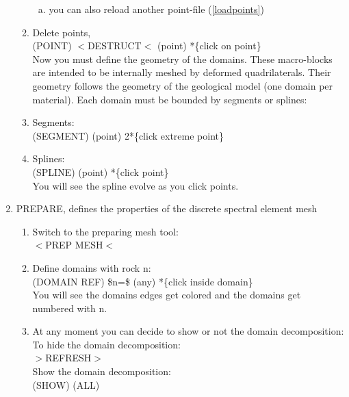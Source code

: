 \begin{enumerate}[STEP I:]
\begin{enumerate}[1.]
\begin{enumerate}[a.]
  \item you can also reload another point-file (\ref{loadpoints})

  \end{enumerate}

\item Delete points, \\
	\textsf{(POINT) $<$DESTRUCT$<$ (point) *\{click on point\}}\\

Now you must define the geometry of the domains. These
macro-blocks are intended to be internally meshed by 
deformed quadrilaterals. Their geometry follows the geometry
of the geological model (one domain per material).
Each domain must be bounded by segments or splines:

\item Segments:\\
	\textsf{(SEGMENT) (point) 2*\{click extreme point\}}

\item Splines:\\
        \textsf{(SPLINE) (point) *\{click point\}}\\
   You will see the spline evolve as you click points.

\end{enumerate}


\item PREPARE, defines the properties of the discrete spectral element mesh

  \begin{enumerate}[1.]

  \item Switch to the preparing mesh tool:\\
	\textsf{$<$PREP MESH$<$}

  \item Define domains with rock n:\\
	\textsf{(DOMAIN REF) \$n=\$ (any) *\{click inside domain\}}\\
   You will see the domains edges get colored and the 
   domains get numbered with n.

  \item At any moment you can decide to show or not the
domain decomposition:\\ 
  To hide the domain decomposition:\\
        \textsf{$>$REFRESH$>$}\\
  Show the domain decomposition:\\
	\textsf{(SHOW) (ALL)}


\end{enumerate}
\end{enumerate}
